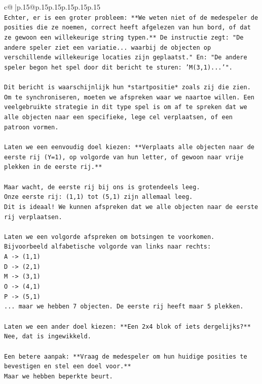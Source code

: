 \documentclass{article}
\begin{document}
{\begin{supertabular}{c@{$\;$}|p{.15\linewidth}@{}p{.15\linewidth}p{.15\linewidth}p{.15\linewidth}p{.15\linewidth}p{.15\linewidth}}
{{{\\ 
\texttt{Echter, er is een groter probleem: **We weten niet of de medespeler de posities die ze noemen, correct heeft afgelezen van hun bord, of dat ze gewoon een willekeurige string typen.** De instructie zegt: "De andere speler ziet een variatie... waarbij de objecten op verschillende willekeurige locaties zijn geplaatst." En: "De andere speler begon het spel door dit bericht te sturen: 'M(3,1)...'".} \\
\\ 
\texttt{Dit bericht is waarschijnlijk hun *startpositie* zoals zij die zien. Om te synchroniseren, moeten we afspreken waar we naartoe willen. Een veelgebruikte strategie in dit type spel is om af te spreken dat we alle objecten naar een specifieke, lege cel verplaatsen, of een patroon vormen.} \\
\\ 
\texttt{Laten we een eenvoudig doel kiezen: **Verplaats alle objecten naar de eerste rij (Y=1), op volgorde van hun letter, of gewoon naar vrije plekken in de eerste rij.**} \\
\\ 
\texttt{Maar wacht, de eerste rij bij ons is grotendeels leeg.} \\
\texttt{Onze eerste rij: (1,1) tot (5,1) zijn allemaal leeg.} \\
\texttt{Dit is ideaal! We kunnen afspreken dat we alle objecten naar de eerste rij verplaatsen.} \\
\\ 
\texttt{Laten we een volgorde afspreken om botsingen te voorkomen. Bijvoorbeeld alfabetische volgorde van links naar rechts:} \\
\texttt{A {-}> (1,1)} \\
\texttt{D {-}> (2,1)} \\
\texttt{M {-}> (3,1)} \\
\texttt{O {-}> (4,1)} \\
\texttt{P {-}> (5,1)} \\
\texttt{... maar we hebben 7 objecten. De eerste rij heeft maar 5 plekken.} \\
\\ 
\texttt{Laten we een ander doel kiezen: **Een 2x4 blok of iets dergelijks?** Nee, dat is ingewikkeld.} \\
\\ 
\texttt{Een betere aanpak: **Vraag de medespeler om hun huidige posities te bevestigen en stel een doel voor.**} \\
\texttt{Maar we hebben beperkte beurt.} \\
}}}
\end{supertabular}}
\end{document}
